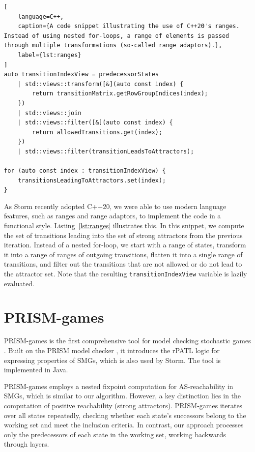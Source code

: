 \begin{lstfloat}
\begin{lstlisting}[
    language=C++,
    caption={A code snippet illustrating the use of C++20's ranges. Instead of using nested for-loops, a range of elements is passed through multiple transformations (so-called range adaptors).},
    label={lst:ranges}
]
auto transitionIndexView = predecessorStates
    | std::views::transform([&](auto const index) {
        return transitionMatrix.getRowGroupIndices(index);
    }) 
    | std::views::join
    | std::views::filter([&](auto const index) {
        return allowedTransitions.get(index);
    })
    | std::views::filter(transitionLeadsToAttractors);

for (auto const index : transitionIndexView) {
    transitionsLeadingToAttractors.set(index);
}
\end{lstlisting}

\end{lstfloat}

As Storm recently adopted C++20, we were able to use modern language features, such as ranges and range adaptors, to implement the code in a functional style. Listing~\ref{lst:ranges} illustrates this. In this snippet, we compute the set of transitions leading into the set of strong attractors from the previous iteration. Instead of a nested for-loop, we start with a range of states, transform it into a range of ranges of outgoing transitions, flatten it into a single range of transitions, and filter out the transitions that are not allowed or do not lead to the attractor set. Note that the resulting \texttt{transitionIndexView} variable is lazily evaluated.

\section{PRISM-games}
\label{sec:prism}

PRISM-games is the first comprehensive tool for model checking stochastic games \cite{hutchison_prism-games_2013}. Built on the PRISM model checker \cite{kwiatkowska_prism_2011}, it introduces the rPATL logic for expressing properties of SMGs, which is also used by Storm. The tool is implemented in Java.

PRISM-games employs a nested fixpoint computation for AS-reachability in SMGs, which is similar to our algorithm. However, a key distinction lies in the computation of positive reachability (strong attractors). PRISM-games iterates over all states repeatedly, checking whether each state’s successors belong to the working set and meet the inclusion criteria. In contrast, our approach processes only the predecessors of each state in the working set, working backwards through layers.

